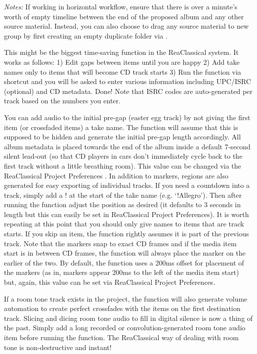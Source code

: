 \documentclass[10pt,american]{article}
\begin{document}
\emph{Notes: } If working in horizontal workflow, ensure that there is over a minute's
worth of empty timeline between the end of the proposed album and any other
source material. Instead, you can also choose to drag any source material to new group by
first creating an empty duplicate folder via \keys{\textbackslash}.

This might be the biggest time-saving function in the ReaClassical
system. It works as follows: 1) Edit gaps between items until you are happy 2)
Add take names only to items that will become CD track starts 3) Run the
function via shortcut  and you will be asked to enter various
information including UPC/ISRC (optional) and CD metadata. Done! Note that ISRC
codes are auto-generated per track based on the numbers you enter.

You can add audio to the initial pre-gap (easter egg track) by not giving the
first item (or crossfaded items) a take name. The function will assume that this
is supposed to be hidden and generate the initial pre-gap length accordingly.
All album metadata is placed towards the end of the album inside a default
7-second silent lead-out (so that CD players in cars don't immediately cycle
back to the first track without a little breathing room). This value can be
changed via the ReaClassical Project Preferences  . In addition to
markers, regions are also generated for easy exporting of individual tracks. If
you need a countdown into a track, simply add a ! at the start of the take name
(e.g. `!Allegro'). Then after running the function adjust the position as
desired (it defaults to 3 seconds in length but this can easily be set in
ReaClassical Project Preferences). It is worth repeating at this point that you
should only give names to items that are track starts. If you skip an item, the
function rightly assumes it is part of the previous track. Note that the markers
snap to exact CD frames and if the media item start is in between CD frames, the
function will always place the marker on the earlier of the two. By default, the
function uses a 200ms offset for placement of the markers (as in, markers appear
200ms to the left of the media item start) but, again, this value can be set via
ReaClassical Project Preferences.

If a room tone track exists in the project, the function will also generate
volume automation to create perfect crossfades with the items on the first
destination track. Slicing and dicing room tone audio to fill in digital silence
is now a thing of the past. Simply add a long recorded or convolution-generated
room tone audio item before running the function. The ReaClassical way of
dealing with room tone is non-destructive and instant! 
\end{document}

